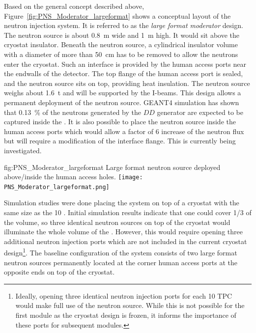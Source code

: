 Based on the general concept described above, Figure~\ref{fig:PNS_Moderator_largeformat} shows a conceptual layout of the neutron injection system. It is referred to as the {\it large format moderator} design. The neutron source is about \SI{0.8}{\m} wide and \SI{1}{\m} high. It would sit above the cryostat insulator. Beneath the neutron source, a cylindrical insulator volume with a diameter of more than \SI{50}{\cm} has to be removed to allow the neutrons enter the cryostat. Such an interface is provided by the human access ports near the endwalls of the detector.
The top flange of the human access port is sealed, and the neutron source sits on top, providing heat insulation. The neutron source weighs about \SI{1.6}{\tonne} and will be supported by the I-beams. 
This design allows a permanent deployment of the neutron source. GEANT4 simulation has shown that \SI{0.13}{\%} of the neutrons generated by the $DD$ generator are expected to be captured inside the . It is also possible to place the neutron source inside the human access ports which would allow a factor of \num{6} increase of the neutron flux but will require a modification of the interface flange. This is currently being investigated.

\begin{dunefigure}{fig:PNS_Moderator_largeformat}
{Large format neutron source deployed above/inside the human access holes.}
\texttt{[image: PNS\_Moderator\_largeformat.png]}
\end{dunefigure}


Simulation studies were done placing the  system on top of a cryostat with the same size as the  \SI{10}{\kton} . Initial simulation results indicate that one  could cover 1/3 of the  volume, so three identical neutron sources on top of the cryostat would illuminate the whole  volume of the  . However, this would require opening three additional neutron injection ports which are not included in the current cryostat design\footnote{Ideally, opening three identical neutron injection ports for each \SI{10}{\kton} TPC would make full use of the neutron source. While this is not possible for the first  module as the cryostat design is frozen, it informs the importance of these ports for subsequent  modules.}. The baseline configuration of the  system consists of two large format neutron sources permanently located at the corner human access ports at the opposite ends on top of the cryostat. 

